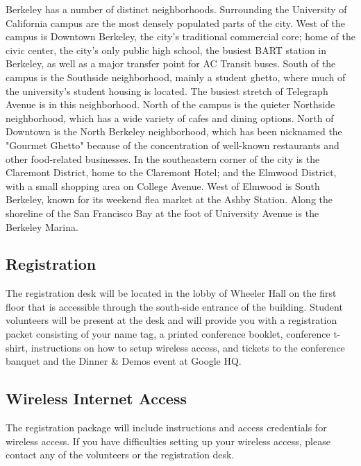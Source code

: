 Berkeley has a number of distinct neighborhoods. Surrounding the University of California campus are the most densely populated parts of the city. West of the campus is Downtown Berkeley, the city's traditional commercial core; home of the civic center, the city's only public high school, the busiest BART station in Berkeley, as well as a major transfer point for AC Transit buses. South of the campus is the Southside neighborhood, mainly a student ghetto, where much of the university's student housing is located. The busiest stretch of Telegraph Avenue is in this neighborhood. North of the campus is the quieter Northside neighborhood, which has a wide variety of cafes and dining options. North of Downtown is the North Berkeley neighborhood, which has been nicknamed the "Gourmet Ghetto" because of the concentration of well-known restaurants and other food-related businesses. In the southeastern corner of the city is the Claremont District, home to the Claremont Hotel; and the Elmwood District, with a small shopping area on College Avenue. West of Elmwood is South Berkeley, known for its weekend flea market at the Ashby Station. Along the shoreline of the San Francisco Bay at the foot of University Avenue is the Berkeley Marina. 

\vspace{3mm}

\subsection*{Registration}

The registration desk will be located in the lobby of Wheeler Hall on the first floor that is accessible through the south-side entrance of the building. Student volunteers will be present at the desk and will provide you with a registration packet consisting of your name tag, a printed conference booklet, conference t-shirt, instructions on how to setup wireless access, and tickets to the conference banquet and the Dinner \& Demos event at Google HQ.

\vspace{3mm}
\subsection*{Wireless Internet Access}
The registration package will include instructions and access credentials for wireless access. If you have difficulties setting up your wireless access, please contact any of the volunteers or the registration desk.

